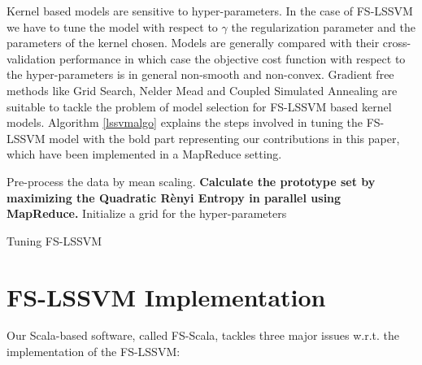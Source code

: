 \documentclass[conference, cmex10]{IEEEtran}
\begin{document}
Kernel based models are sensitive to hyper-parameters. In the case of FS-LSSVM we have to tune the model with respect to $\gamma$ the regularization parameter and the parameters of the kernel chosen. Models are generally compared with their cross-validation performance in which case the objective cost function with respect to the hyper-parameters is in general non-smooth and non-convex. Gradient free methods like Grid Search, Nelder Mead \cite{Nelder1965} and Coupled Simulated Annealing \cite{Xavier-De-Souza2010} are suitable to tackle the problem of model selection for FS-LSSVM based kernel models. Algorithm \ref{lssvmalgo} explains the steps involved in tuning the FS-LSSVM model with the bold part representing our contributions in this paper, which have been implemented in a MapReduce setting.

\begin{algorithm}[!htbp] \label{lssvmalgo}
\SetAlgoLined
{}
 Pre-process the data by mean scaling.\;
 \textbf{Calculate the prototype set by maximizing the Quadratic R\`enyi Entropy in parallel using MapReduce.}\;
 Initialize a grid for the hyper-parameters\;
 \caption{Tuning FS-LSSVM}
\end{algorithm}

\section{FS-LSSVM Implementation} \label{fsimpl}

Our Scala-based \cite{scala-overview-tech-report} software, called FS-Scala, tackles three major issues w.r.t. the implementation of the FS-LSSVM:
\end{document}
